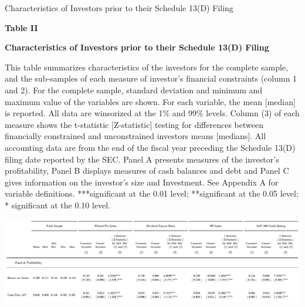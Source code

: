 \documentclass[12pt]{article}
\begin{document}
\begin{table}
	\centering
	\captionsetup{textformat=empty,labelformat=blank}
	\caption{Characteristics of Investors prior to their Schedule 13(D) Filing}
	\textbf{Table II}\par\medskip
	\large\textbf{Characteristics of Investors prior to their Schedule 13(D) Filing\\}\par\medskip
	\justifying
	\footnotesize\noindent{}This table summarizes characteristics of the investors for the complete sample, and the sub-samples of each measure of investor's financial constraints (column 1 and 2). For the complete sample,  standard deviation and minimum and maximum value of the variables are shown. For each variable, the mean [median] is reported. All data are winsorized at the 1\% and 99\% levels. Column (3) of each measure shows the t-statistic [Z-statistic] testing for differences between financially constrained and unconstrained investors means [medians]. All accounting data are from the end of the fiscal year preceding the Schedule 13(D) filing date reported by the SEC. Panel A presents measures of the investor's profitability, Panel B displays  measures of cash balances and debt and Panel C gives information on the investor's size and Investment. See Appendix A for variable definitions. ***significant at the 0.01 level; **significant at the 0.05 level; * significant at the 0.10 level.\par\medskip
	\centering													
	\begin{adjustbox}{width=\textwidth}
		\includegraphics{Summary1}
	\end{adjustbox}\par\medskip
\end{table}
\end{document}
